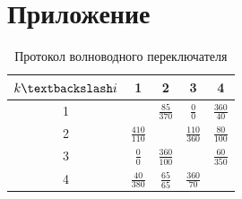 \newpage
\section{Приложение}
\begin{table}[h!]
    \centering
    \begin{tabular}{|c|c|c|c|c|}
    \hline
     $k \textbackslash i$ & 1 & 2 & 3 & 4 \\ \hline
    1 & \cellcolor{black!70}  & $\frac{85}{370}$ & $\frac{0}{0}$& $\frac{360}{40}$  \\ \hline
    2 & $\frac{410}{110}$  &\cellcolor{black!70}   & $\frac{110}{360}$  & $\frac{80}{100}$  \\ \hline
    3 & $\frac{0}{0}$  & $\frac{360}{100}$  & \cellcolor{black!70}  &  $\frac{60}{350}$ \\ \hline
    4 & $\frac{40}{380}$  & $\frac{65}{65}$  & $\frac{360}{70}$  & \cellcolor{black!70} \\ \hline
    \end{tabular}
    \caption{Протокол волноводного переключателя}
    \label{tab:phaser}
    \end{table}


